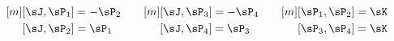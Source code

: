 \begin{equation*}
  \begin{aligned}[m]
    [\sJ,\sP_1] &= - \sP_2\\
    [\sJ,\sP_2] &=  \sP_1
  \end{aligned}\qquad
  \begin{aligned}[m]
    [\sJ,\sP_3] &= - \sP_4\\
    [\sJ,\sP_4] &=  \sP_3
  \end{aligned}\qquad
  \begin{aligned}[m]
    [\sP_1,\sP_2] &= \sK\\
    [\sP_3,\sP_4] &= \sK
  \end{aligned}
\end{equation*}

